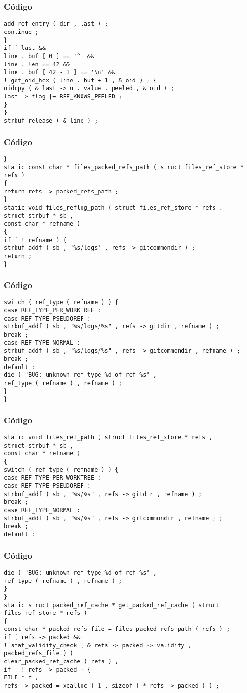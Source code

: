 \documentclass{beamer}
\begin{document}
\begin{frame}[fragile]
\frametitle{C\'odigo}
\begin{verbatim}
add_ref_entry ( dir , last ) ; 
continue ; 
} 
if ( last && 
line . buf [ 0 ] == '^' && 
line . len == 42 && 
line . buf [ 42 - 1 ] == '\n' && 
! get_oid_hex ( line . buf + 1 , & oid ) ) { 
oidcpy ( & last -> u . value . peeled , & oid ) ; 
last -> flag |= REF_KNOWS_PEELED ; 
} 
} 
strbuf_release ( & line ) ; 
\end{verbatim}
\end{frame}
\begin{frame}[fragile]
\frametitle{C\'odigo}
\begin{verbatim}
} 
static const char * files_packed_refs_path ( struct files_ref_store * refs ) 
{ 
return refs -> packed_refs_path ; 
} 
static void files_reflog_path ( struct files_ref_store * refs , 
struct strbuf * sb , 
const char * refname ) 
{ 
if ( ! refname ) { 
strbuf_addf ( sb , "%s/logs" , refs -> gitcommondir ) ; 
return ; 
} 
\end{verbatim}
\end{frame}
\begin{frame}[fragile]
\frametitle{C\'odigo}
\begin{verbatim}
switch ( ref_type ( refname ) ) { 
case REF_TYPE_PER_WORKTREE : 
case REF_TYPE_PSEUDOREF : 
strbuf_addf ( sb , "%s/logs/%s" , refs -> gitdir , refname ) ; 
break ; 
case REF_TYPE_NORMAL : 
strbuf_addf ( sb , "%s/logs/%s" , refs -> gitcommondir , refname ) ; 
break ; 
default : 
die ( "BUG: unknown ref type %d of ref %s" , 
ref_type ( refname ) , refname ) ; 
} 
} 
\end{verbatim}
\end{frame}
\begin{frame}[fragile]
\frametitle{C\'odigo}
\begin{verbatim}
static void files_ref_path ( struct files_ref_store * refs , 
struct strbuf * sb , 
const char * refname ) 
{ 
switch ( ref_type ( refname ) ) { 
case REF_TYPE_PER_WORKTREE : 
case REF_TYPE_PSEUDOREF : 
strbuf_addf ( sb , "%s/%s" , refs -> gitdir , refname ) ; 
break ; 
case REF_TYPE_NORMAL : 
strbuf_addf ( sb , "%s/%s" , refs -> gitcommondir , refname ) ; 
break ; 
default : 
\end{verbatim}
\end{frame}
\begin{frame}[fragile]
\frametitle{C\'odigo}
\begin{verbatim}
die ( "BUG: unknown ref type %d of ref %s" , 
ref_type ( refname ) , refname ) ; 
} 
} 
static struct packed_ref_cache * get_packed_ref_cache ( struct files_ref_store * refs ) 
{ 
const char * packed_refs_file = files_packed_refs_path ( refs ) ; 
if ( refs -> packed && 
! stat_validity_check ( & refs -> packed -> validity , packed_refs_file ) ) 
clear_packed_ref_cache ( refs ) ; 
if ( ! refs -> packed ) { 
FILE * f ; 
refs -> packed = xcalloc ( 1 , sizeof ( * refs -> packed ) ) ; 
\end{verbatim}
\end{frame}
\end{document}
